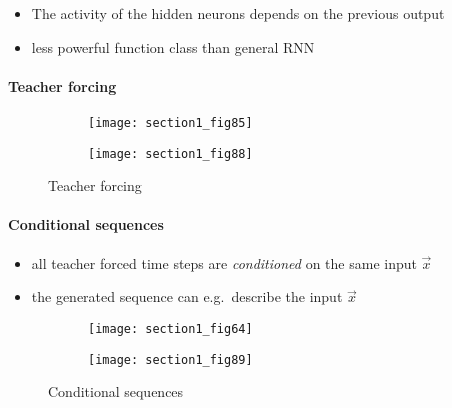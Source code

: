 \begin{itemize}
		\item The activity of the hidden neurons depends on the previous output
		\item less powerful function class than general RNN 
\end{itemize}
\paragraph{Teacher forcing}
\begin{figure}[h]
	\begin{subfigure}{0.22\textwidth}
	\texttt{[image: section1\_fig85]}
	\end{subfigure}
	\begin{subfigure}{0.69\textwidth}
	\texttt{[image: section1\_fig88]}
	\end{subfigure}
	\caption{Teacher forcing}
\end{figure}

\paragraph{Conditional sequences}
	\begin{itemize}
		\item all teacher forced time steps are {\em conditioned} 
				on the same input $\vec x$
		\vspace{2mm}
		\item the generated sequence can e.g.~describe the input $\vec x$
	\end{itemize}
\begin{figure}[h]
	\begin{subfigure}{0.22\textwidth}
	\texttt{[image: section1\_fig64]}
	\end{subfigure}
	\begin{subfigure}{0.69\textwidth}
	\texttt{[image: section1\_fig89]}
	\end{subfigure}
	\caption{Conditional sequences}
\end{figure}

